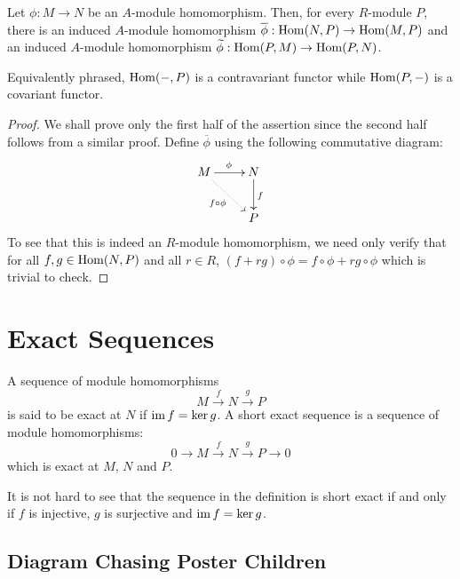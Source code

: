 \begin{theorem}
    Let $\phi: M\to N$ be an $A$-module homomorphism. Then, for every $R$-module $P$, there is an induced $A$-module homomorphism $\overline\phi:\operatorname{Hom}(N,P)\to\operatorname{Hom}(M,P)$ and an induced $A$-module homomorphism $\widetilde\phi:\operatorname{Hom}(P,M)\to\operatorname{Hom}(P,N)$. 
    
    Equivalently phrased, $\operatorname{Hom}(-,P)$ is a contravariant functor while $\operatorname{Hom}(P,-)$ is a covariant functor.
\end{theorem}
\begin{proof}
    We shall prove only the first half of the assertion since the second half follows from a similar proof. Define $\overline\phi$ using the following commutative diagram: 
    \begin{equation*}
    \xymatrix {
        M\ar[r]^{\phi}\ar@{.>}[rd]_{f\circ\phi} & N\ar[d]^f\\
        & P
    }
    \end{equation*}
    To see that this is indeed an $R$-module homomorphism, we need only verify that for all $f,g\in\operatorname{Hom}(N,P)$ and all $r\in R$, $(f + rg)\circ\phi = f\circ\phi + rg\circ\phi$ which is trivial to check.
\end{proof}

\section{Exact Sequences}

\begin{definition}
    A sequence of module homomorphisms 
    \begin{equation*}
        M\stackrel{f}{\longrightarrow} N\stackrel{g}{\longrightarrow}P
    \end{equation*}
    is said to be exact at $N$ if $\operatorname{im} f = \ker g$. A short exact sequence is a sequence of module homomorphisms: 
    \begin{equation*}
        0\longrightarrow M\stackrel{f}{\longrightarrow} N\stackrel{g}{\longrightarrow} P\longrightarrow 0
    \end{equation*}
    which is exact at $M$, $N$ and $P$.
\end{definition}

It is not hard to see that the sequence in the definition is short exact if and only if $f$ is injective, $g$ is surjective and $\operatorname{im} f = \ker g$.

\subsection{Diagram Chasing Poster Children}


